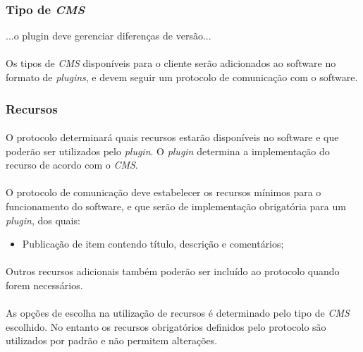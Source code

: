 \documentclass[a4paper,12pt]{article}
\def\cms{\emph{CMS}}
\def\plugin{\emph{plugin}}
\begin{document}
\subsubsection{Tipo de \cms{}}

...o plugin deve gerenciar diferenças de versão...

\paragraph{}
Os tipos de \cms{} disponíveis para o cliente serão adicionados ao software no formato de \emph{plugins}, e devem seguir um protocolo de comunicação com o software.

\subsubsection{Recursos}

\paragraph{}
O protocolo determinará quais recursos estarão disponíveis no software e que poderão ser utilizados pelo \plugin{}. O \plugin{} determina a implementação do recurso de acordo com o \cms{}.
\paragraph{}
O protocolo de comunicação deve estabelecer os recursos mínimos para o funcionamento do software, e que serão de implementação obrigatória para um \plugin{}, dos quais:

\begin{itemize}
\item Publicação de item contendo título, descrição e comentários;
\end{itemize}

\paragraph{}
Outros recursos adicionais também poderão ser incluído ao protocolo quando forem necessários.

\paragraph{}
As opções de escolha na utilização de recursos é determinado pelo tipo de \cms{} escolhido. No entanto os recursos obrigatórios definidos pelo protocolo são utilizados por padrão e não permitem alterações.
\end{document}
